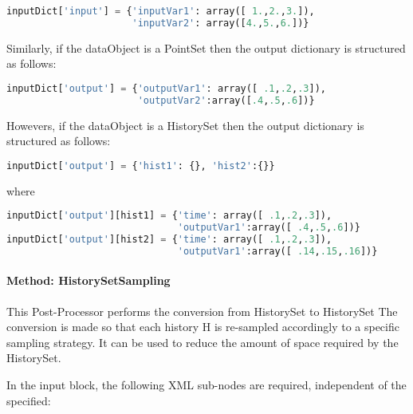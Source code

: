 \begin{lstlisting}[language=python]
inputDict['input'] = {'inputVar1': array([ 1.,2.,3.]),
                      'inputVar2': array([4.,5.,6.])}
\end{lstlisting}

Similarly, if the dataObject is a PointSet then the output dictionary is
structured as follows:

\begin{lstlisting}[language=python]
inputDict['output'] = {'outputVar1': array([ .1,.2,.3]),
                       'outputVar2':array([.4,.5,.6])}
\end{lstlisting}

Howevers, if the dataObject is a HistorySet then the output dictionary is
structured as follows:

\begin{lstlisting}[language=python]
inputDict['output'] = {'hist1': {}, 'hist2':{}}
\end{lstlisting}

where

\begin{lstlisting}[language=python]
inputDict['output'][hist1] = {'time': array([ .1,.2,.3]),
                              'outputVar1':array([ .4,.5,.6])}
inputDict['output'][hist2] = {'time': array([ .1,.2,.3]),
                              'outputVar1':array([ .14,.15,.16])}
\end{lstlisting}

\paragraph{Method: HistorySetSampling}
This Post-Processor performs the conversion from HistorySet to HistorySet
The conversion is made so that each history H is re-sampled accordingly  to a
specific sampling strategy.
It can be used to reduce the amount of space required by the HistorySet.

In the  input block, the following XML sub-nodes are required,
independent of the  specified:

